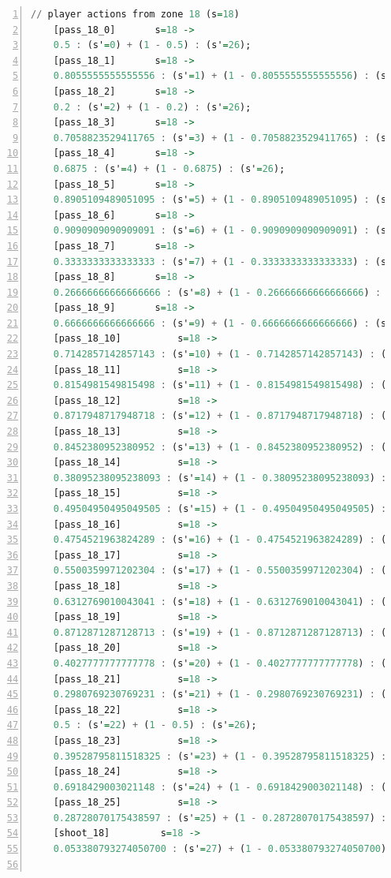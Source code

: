 \documentclass{l4proj}
\begin{document}
\begin{appendices}
\begin{lstlisting}[language=Haskell, numbers=left, caption=MDP used for strategy generation. This is the model specification as-is after the refinements at the end of chapter 3.]
	// player actions from zone 18 (s=18)
	[pass_18_0]	      s=18 ->
	0.5 : (s'=0) + (1 - 0.5) : (s'=26);
	[pass_18_1]	      s=18 ->
	0.8055555555555556 : (s'=1) + (1 - 0.8055555555555556) : (s'=26);
	[pass_18_2]	      s=18 ->
	0.2 : (s'=2) + (1 - 0.2) : (s'=26);
	[pass_18_3]	      s=18 ->
	0.7058823529411765 : (s'=3) + (1 - 0.7058823529411765) : (s'=26);
	[pass_18_4]	      s=18 ->
	0.6875 : (s'=4) + (1 - 0.6875) : (s'=26);
	[pass_18_5]	      s=18 ->
	0.8905109489051095 : (s'=5) + (1 - 0.8905109489051095) : (s'=26);
	[pass_18_6]	      s=18 ->
	0.9090909090909091 : (s'=6) + (1 - 0.9090909090909091) : (s'=26);
	[pass_18_7]	      s=18 ->
	0.3333333333333333 : (s'=7) + (1 - 0.3333333333333333) : (s'=26);
	[pass_18_8]	      s=18 ->
	0.26666666666666666 : (s'=8) + (1 - 0.26666666666666666) : (s'=26);
	[pass_18_9]	      s=18 ->
	0.6666666666666666 : (s'=9) + (1 - 0.6666666666666666) : (s'=26);
	[pass_18_10]	      s=18 ->
	0.7142857142857143 : (s'=10) + (1 - 0.7142857142857143) : (s'=26);
	[pass_18_11]	      s=18 ->
	0.8154981549815498 : (s'=11) + (1 - 0.8154981549815498) : (s'=26);
	[pass_18_12]	      s=18 ->
	0.8717948717948718 : (s'=12) + (1 - 0.8717948717948718) : (s'=26);
	[pass_18_13]	      s=18 ->
	0.8452380952380952 : (s'=13) + (1 - 0.8452380952380952) : (s'=26);
	[pass_18_14]	      s=18 ->
	0.38095238095238093 : (s'=14) + (1 - 0.38095238095238093) : (s'=26);
	[pass_18_15]	      s=18 ->
	0.49504950495049505 : (s'=15) + (1 - 0.49504950495049505) : (s'=26);
	[pass_18_16]	      s=18 ->
	0.4754521963824289 : (s'=16) + (1 - 0.4754521963824289) : (s'=26);
	[pass_18_17]	      s=18 ->
	0.5500359971202304 : (s'=17) + (1 - 0.5500359971202304) : (s'=26);
	[pass_18_18]	      s=18 ->
	0.6312769010043041 : (s'=18) + (1 - 0.6312769010043041) : (s'=26);
	[pass_18_19]	      s=18 ->
	0.8712871287128713 : (s'=19) + (1 - 0.8712871287128713) : (s'=26);
	[pass_18_20]	      s=18 ->
	0.4027777777777778 : (s'=20) + (1 - 0.4027777777777778) : (s'=26);
	[pass_18_21]	      s=18 ->
	0.2980769230769231 : (s'=21) + (1 - 0.2980769230769231) : (s'=26);
	[pass_18_22]	      s=18 ->
	0.5 : (s'=22) + (1 - 0.5) : (s'=26);
	[pass_18_23]	      s=18 ->
	0.39528795811518325 : (s'=23) + (1 - 0.39528795811518325) : (s'=26);
	[pass_18_24]	      s=18 ->
	0.6918429003021148 : (s'=24) + (1 - 0.6918429003021148) : (s'=26);
	[pass_18_25]	      s=18 ->
	0.28728070175438597 : (s'=25) + (1 - 0.28728070175438597) : (s'=26);
	[shoot_18]	       s=18 ->
	0.053380793274050700 : (s'=27) + (1 - 0.053380793274050700) : (s'=26);


\end{lstlisting}
\end{appendices}
\end{document}
